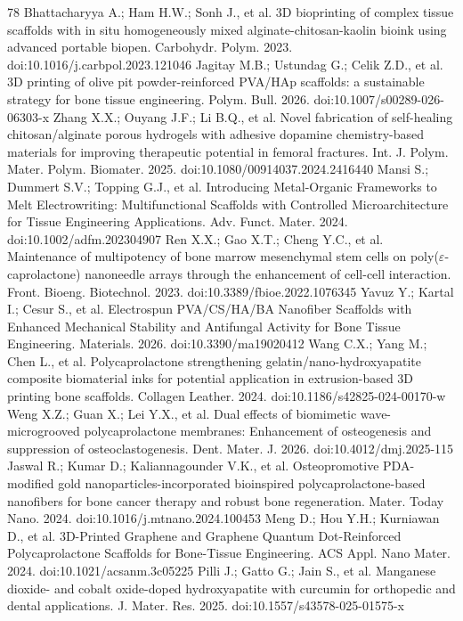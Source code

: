 \documentclass[5p,times,twocolumn]{elsarticle}
\begin{document}
\begin{thebibliography}{78}
 Bhattacharyya A.; Ham H.W.; Sonh J., et al. 3D bioprinting of complex tissue scaffolds with in situ homogeneously mixed alginate-chitosan-kaolin bioink using advanced portable biopen. Carbohydr. Polym. 2023. doi:10.1016/j.carbpol.2023.121046
 Jagitay M.B.; Ustundag G.; Celik Z.D., et al. 3D printing of olive pit powder-reinforced PVA/HAp scaffolds: a sustainable strategy for bone tissue engineering. Polym. Bull. 2026. doi:10.1007/s00289-026-06303-x
 Zhang X.X.; Ouyang J.F.; Li B.Q., et al. Novel fabrication of self-healing chitosan/alginate porous hydrogels with adhesive dopamine chemistry-based materials for improving therapeutic potential in femoral fractures. Int. J. Polym. Mater. Polym. Biomater. 2025. doi:10.1080/00914037.2024.2416440
 Mansi S.; Dummert S.V.; Topping G.J., et al. Introducing Metal-Organic Frameworks to Melt Electrowriting: Multifunctional Scaffolds with Controlled Microarchitecture for Tissue Engineering Applications. Adv. Funct. Mater. 2024. doi:10.1002/adfm.202304907
 Ren X.X.; Gao X.T.; Cheng Y.C., et al. Maintenance of multipotency of bone marrow mesenchymal stem cells on poly($\varepsilon$-caprolactone) nanoneedle arrays through the enhancement of cell-cell interaction. Front. Bioeng. Biotechnol. 2023. doi:10.3389/fbioe.2022.1076345
 Yavuz Y.; Kartal I.; Cesur S., et al. Electrospun PVA/CS/HA/BA Nanofiber Scaffolds with Enhanced Mechanical Stability and Antifungal Activity for Bone Tissue Engineering. Materials. 2026. doi:10.3390/ma19020412
 Wang C.X.; Yang M.; Chen L., et al. Polycaprolactone strengthening gelatin/nano-hydroxyapatite composite biomaterial inks for potential application in extrusion-based 3D printing bone scaffolds. Collagen Leather. 2024. doi:10.1186/s42825-024-00170-w
 Weng X.Z.; Guan X.; Lei Y.X., et al. Dual effects of biomimetic wave-microgrooved polycaprolactone membranes: Enhancement of osteogenesis and suppression of osteoclastogenesis. Dent. Mater. J. 2026. doi:10.4012/dmj.2025-115
 Jaswal R.; Kumar D.; Kaliannagounder V.K., et al. Osteopromotive PDA-modified gold nanoparticles-incorporated bioinspired polycaprolactone-based nanofibers for bone cancer therapy and robust bone regeneration. Mater. Today Nano. 2024. doi:10.1016/j.mtnano.2024.100453
 Meng D.; Hou Y.H.; Kurniawan D., et al. 3D-Printed Graphene and Graphene Quantum Dot-Reinforced Polycaprolactone Scaffolds for Bone-Tissue Engineering. ACS Appl. Nano Mater. 2024. doi:10.1021/acsanm.3c05225
 Pilli J.; Gatto G.; Jain S., et al. Manganese dioxide- and cobalt oxide-doped hydroxyapatite with curcumin for orthopedic and dental applications. J. Mater. Res. 2025. doi:10.1557/s43578-025-01575-x

\end{thebibliography}
\end{document}
